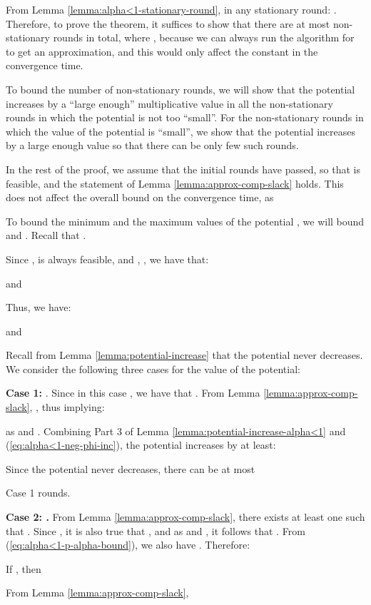 \documentclass[11pt]{article}
\makeatletter
\newenvironment{proofof}[1]{\par
  \pushQED{\qed}\normalfont \topsep3\p@\relax
  \trivlist
  \item[\hskip\labelsep
        \bfseries
    Proof of #1\@addpunct{.}]\ignorespaces
}{\popQED\endtrivlist\@endpefalse
}
\makeatother
\begin{document}
\begin{proofof}{Theorem \ref{thm:convergence-alpha<1}}
From Lemma \ref{lemma:alpha<1-stationary-round}, in any stationary round: . Therefore, to prove the theorem, it suffices to show that there are at most  non-stationary rounds in total, where , because we can always run the algorithm for  to get an approximation, and this would only affect the constant in the convergence time. 

To bound the number of non-stationary rounds, we will show that the potential increases by a ``large enough'' multiplicative value in all the non-stationary rounds in which the potential is not too ``small''. For the non-stationary rounds in which the value of the potential is ``small'', we show that the potential increases by a large enough value so that there can be only few such rounds. 

In the rest of the proof, we assume that the initial  rounds have passed, so that  is feasible, and the statement of Lemma \ref{lemma:approx-comp-slack} holds. This does not affect the overall bound on the convergence time, as 


To bound the minimum and the maximum values of the potential , we will bound  and . Recall that . 

Since ,  is always feasible, and , , we have that:

and

Thus, we have:

and


Recall from Lemma \ref{lemma:potential-increase} that the potential never decreases. We consider the following three cases for the value of the potential:

\noindent \textbf{Case 1: }. Since in this case , we have that . From Lemma \ref{lemma:approx-comp-slack}, , thus implying: 

as  and . Combining Part 3 of Lemma \ref{lemma:potential-increase-alpha<1} and (\ref{eq:alpha<1-neg-phi-inc}), the potential increases by at least:

Since the potential never decreases, there can be at most 

Case 1 rounds.

\noindent\textbf{Case 2: .} From Lemma \ref{lemma:approx-comp-slack}, there exists at least one  such that . Since  , it is also true that , and as  and , it follows that . From (\ref{eq:alpha<1-p-alpha-bound}), we also have . Therefore:

If , then 

From Lemma \ref{lemma:approx-comp-slack}, 


\end{proofof}
\end{document}
